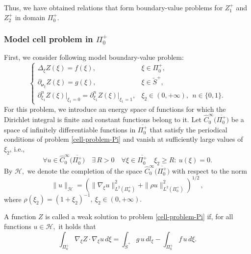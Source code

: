 \documentclass[reqno]{amsart}            %
\numberwithin{equation}{section}
\begin{document}
	Thus, we have obtained relations that form boundary-value problems for $Z^+_1$ and $Z^+_2$ in  domain $\Pi^+_0.$
	
	
	\subsubsection{Model cell problem in $\Pi^+_0$}
	
	First, we consider following model boundary-value problem:
	\begin{equation}\label{cell-problem-Pi}
		\left\{
		\begin{array}{ll}
			\Delta_{\xi}Z(\xi)  = f(\xi) , & \xi\in\Pi^+_0,
			\\[3pt]
			\partial_{\boldsymbol{\nu}_\xi}Z(\xi) =  g(\xi),
			&  \xi \in \tilde{S}^+,
			\\[3pt]
			\partial^n_{\xi_1}Z(\xi)\big|_{\xi_1=0} = \partial^n_{\xi_1}Z(\xi)\big|_{\xi_1=1}, & \xi_2\in (0, +\infty), \ \ n\in\{0, 1\}.
		\end{array}
		\right.
	\end{equation}
	For this problem, we introduce an energy space of functions for which the Dirichlet integral is finite and constant functions belong to it.
	Let  $\widehat{C}^{\infty}_0\big(\overline{\Pi^+_0}\big)$ be a space of infinitely   differentiable functions in $\overline{\Pi^+_0}$ that satisfy the   periodical conditions of problem \eqref{cell-problem-Pi}  and  vanish at sufficiently large values of   $\xi_2$,
	i.e.,     
	$$
	\forall u\in
	\widehat{C}^{\infty}_0\big(\overline{\Pi^+_0}\big)\quad\exists\, R>0\quad\forall \xi \in \overline{\Pi^+_0} \quad \xi_2 \ge R\colon \  u(\xi)=0 .
	$$
	By $ \mathcal{H},$ we denote the completion of the space $\widehat{C}^{\infty}_0\big(\overline{\Pi^+_0}\big)$ with respect to  the norm
	$$
	\|u\|_{\mathcal{H}}=\left(\|\nabla_{\xi}u \|^2_{L^2(\Pi^+_0)}+\|\rho   u\|^2_{L^2(\Pi^+_0)}\right)^{1/2}\, ,
	$$
	where  $\rho(\xi_2)=(1+ \xi_2)^{-1} ,\ \xi_2 \in (0, +\infty).$  
	
	A  function $Z$ is called a weak solution to  problem \eqref{cell-problem-Pi}
	if, for all functions $u\in\mathcal{H},$  it holds that 
	\begin{equation}\label{eq-16}
		\int_{\Pi^+_0}\nabla_{\xi}Z\cdot\nabla_{\xi}u\,d\xi =    \int_{\tilde{S}^+} g\, u\, dl_\xi - \int_{\Pi^+_0}f \, u\,d\xi  .  
	\end{equation}
	
\end{document}
